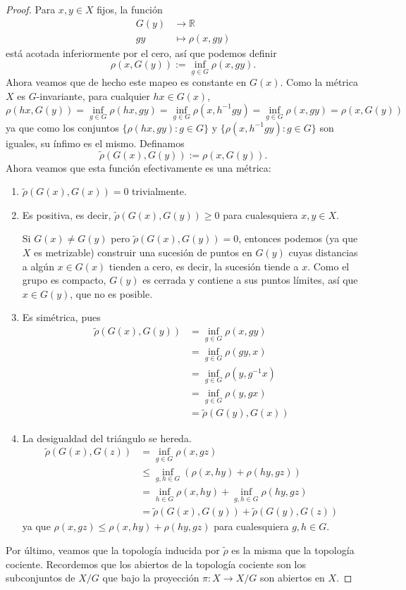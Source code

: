 \documentclass[spanish]{article}
\theoremstyle{definition}
\newcommand{\R}{\mathbb{R}}
\begin{document}
	\begin{proof}
		Para $x,y\in X$ fijos, la función
		\begin{align*}
			G(y)&\to\R\\
			gy&\mapsto\rho(x,gy)
		\end{align*}
		está acotada inferiormente por el cero, así que podemos definir 
		\[\rho(x,G(y)):=\inf_{g\in G}\rho(x,gy).\]
		Ahora veamos que de hecho este mapeo es constante en $G(x)$. Como la métrica  $X$ es $G$-invariante, para cualquier $hx\in G(x)$,
		\[\rho(hx,G(y))=\inf_{g\in G}\rho(hx,gy)=\inf_{g\in G}\rho(x,h^{-1}gy)=\inf_{g\in G}\rho(x,gy)=\rho(x,G(y))\]
		ya que como los conjuntos $\{\rho(hx,gy):g\in G\}$ y $\{\rho(x,h^{-1}gy):g\in G\}$ son iguales, su ínfimo es el mismo.
		Definamos
		\[\tilde{\rho}(G(x),G(y)):=\rho(x,G(y)).\]
		Ahora veamos que esta función efectivamente es una métrica:
		\begin{enumerate}
			\item $\tilde{\rho}(G(x),G(x))=0$ trivialmente.
			
			\item Es positiva, es decir, $\tilde{\rho}(G(x),G(y))\geq0$ para cualesquiera $x,y\in X$.
			
			Si $G(x)\neq G(y)$ pero $\tilde{\rho}(G(x),G(y))=0$, entonces podemos (ya que $X$ es metrizable) construir una sucesión de puntos en $G(y)$ cuyas distancias a algún $x\in G(x)$ tienden a cero, es decir, la sucesión tiende a $x$. Como el grupo es compacto, $G(y)$ es cerrada y contiene a sus puntos límites, así que $x\in G(y)$, que no es posible.
			
			\item Es simétrica, pues
			\begin{align*}
				\tilde{\rho}(G(x),G(y))&=\inf_{g\in G}\rho(x,gy)\\
				&=\inf_{g\in G}\rho(gy,x)\\
				&=\inf_{g\in G}\rho(y,g^{-1}x)\\
				&=\inf_{g\in G}\rho(y,gx)\\
				&=\tilde{\rho}(G(y),G(x))
			\end{align*}
			
			\item La desigualdad del triángulo se hereda.
			\begin{align*}
				\tilde{\rho}(G(x),G(z))&=\inf_{g\in G}\rho(x,gz)\\
				&\leq\inf_{g,h\in G}\left(\rho(x,hy)+\rho(hy,gz)\right)\\
				&=\inf_{h\in G}\rho(x,hy)+\inf_{g,h\in G}\rho(hy,gz)\\
				&=\tilde{\rho}(G(x),G(y))+\tilde{\rho}(G(y),G(z))
			\end{align*}
			ya que $\rho(x,gz)\leq\rho(x,hy)+\rho(hy,gz)$ para cualesquiera $g,h\in G$.
		\end{enumerate}
		Por último, veamos que la topología inducida por $\tilde{\rho}$ es la misma que la topología cociente. Recordemos que los abiertos de la topología cociente son los subconjuntos de $X/G$ que bajo la proyección $\pi:X\to X/G$ son abiertos en $X$.
		

\end{proof}
\end{document}
